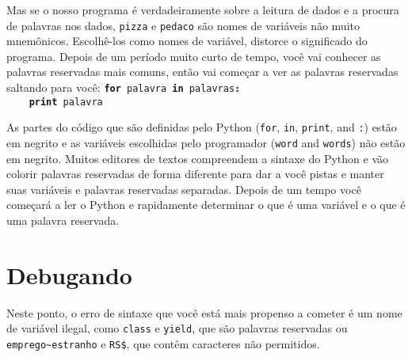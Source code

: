 Mas se o nosso programa é verdadeiramente sobre a leitura de dados e a procura de palavras nos dados, 
{\tt pizza} e {\tt pedaco} são nomes de variáveis não muito mnemônicos. Escolhê-los 
como nomes de variável, distorce o significado do programa.
%
Depois de um período muito curto de tempo, você vai conhecer as palavras reservadas mais comuns,
então vai começar a ver as palavras reservadas saltando para você:
{\tt {\bf for} palavra {\bf in} palavras{\bf :}\\
\verb"    "{\bf print} palavra }
%

As partes do código que são definidas pelo Python ({\tt for}, {\tt in}, {\tt print}, and {\tt :}) estão em negrito 
e as variáveis escolhidas pelo programador ({\tt word} and {\tt words}) não estão em negrito. 
Muitos editores de textos compreendem a sintaxe do Python 
e vão colorir palavras reservadas de forma diferente para dar a você pistas e manter 
suas variáveis e palavras reservadas separadas. 
Depois de um tempo você começará a ler o Python e rapidamente determinar o que 
é uma variável e o que é uma palavra reservada.

\section{Debugando}


Neste ponto, o erro de sintaxe que você está mais propenso a cometer é 
um nome de variável ilegal, como {\tt class} e {\tt yield}, que 
são palavras reservadas ou \verb"emprego~estranho" e \verb"RS$", que contêm 
caracteres não permitidos. 
 

